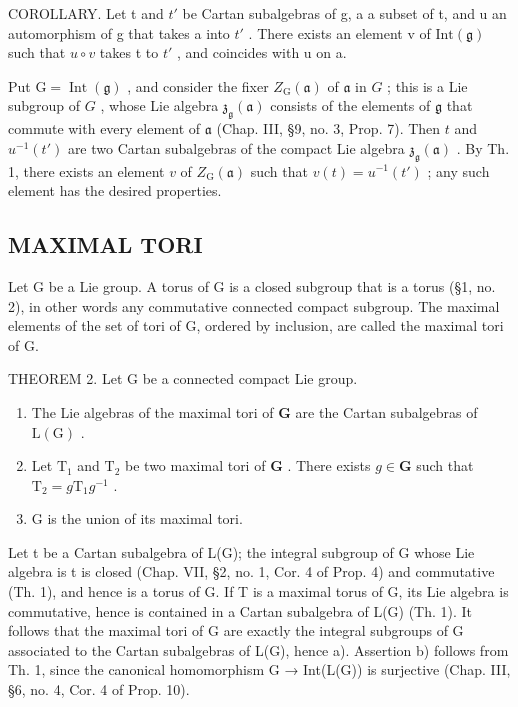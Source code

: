 COROLLARY. Let t and \(t'\) be Cartan subalgebras of g, a a subset of t, and u an automorphism of g that takes a into \(t'\) . There exists an element v of \(\text{Int}(\mathfrak{g})\) such that \(u \circ v\) takes t to \(t'\) , and coincides with u on a.

Put \(\mathrm{G} = \operatorname{Int}(\mathfrak{g})\) , and consider the fixer \(Z_{\mathrm{G}}(\mathfrak{a})\) of \(\mathfrak{a}\) in \(G\) ; this is a Lie subgroup of \(G\) , whose Lie algebra \(\mathfrak{z}_{\mathfrak{g}}(\mathfrak{a})\) consists of the elements of \(\mathfrak{g}\) that commute with every element of \(\mathfrak{a}\) (Chap. III, §9, no. 3, Prop. 7). Then \(t\) and \(u^{-1}(t')\) are two Cartan subalgebras of the compact Lie algebra \(\mathfrak{z}_{\mathfrak{g}}(\mathfrak{a})\) . By Th. 1, there exists an element \(v\) of \(Z_{\mathrm{G}}(\mathfrak{a})\) such that \(v(t) = u^{-1}(t')\) ; any such element has the desired properties.

\subsection{MAXIMAL TORI}

Let G be a Lie group. A torus of G is a closed subgroup that is a torus (§1, no. 2), in other words any commutative connected compact subgroup. The maximal elements of the set of tori of G, ordered by inclusion, are called the maximal tori of G.

THEOREM 2. Let G be a connected compact Lie group.

\begin{enumerate}
\def\labelenumi{\alph{enumi})}
\item
  The Lie algebras of the maximal tori of \(\mathbf{G}\) are the Cartan subalgebras of \(\mathrm{L}(\mathrm{G})\) .
\item
  Let \(\mathrm{T}_1\) and \(\mathrm{T}_2\) be two maximal tori of \(\mathbf{G}\) . There exists \(g \in \mathbf{G}\) such that \(\mathrm{T}_2 = g\mathrm{T}_1g^{-1}\) .
\item
  G is the union of its maximal tori.
\end{enumerate}

Let t be a Cartan subalgebra of L(G); the integral subgroup of G whose Lie algebra is t is closed (Chap. VII, §2, no. 1, Cor. 4 of Prop. 4) and commutative (Th. 1), and hence is a torus of G. If T is a maximal torus of G, its Lie algebra is commutative, hence is contained in a Cartan subalgebra of L(G) (Th. 1). It follows that the maximal tori of G are exactly the integral subgroups of G associated to the Cartan subalgebras of L(G), hence a). Assertion b) follows from Th. 1, since the canonical homomorphism G → Int(L(G)) is surjective (Chap. III, §6, no. 4, Cor. 4 of Prop. 10).

